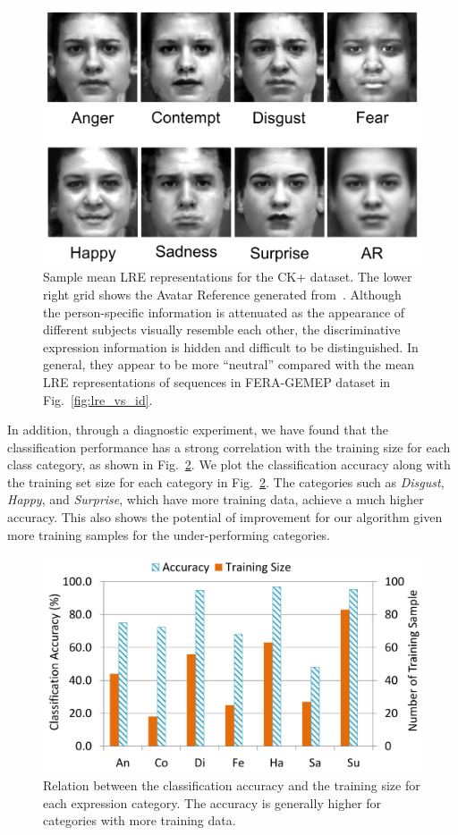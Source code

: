 \documentclass[journal]{IEEEtran}
\begin{document}
\begin{figure}[htbp]
	\centering
		\includegraphics[width=.7\columnwidth]{pics/ck_eai.png}
	\caption{Sample mean LRE representations for the CK+ dataset. The lower right grid shows the Avatar Reference generated from~\cite{Yang_SMCB12}. Although the person-specific information is attenuated as the appearance of different subjects visually resemble each other, the discriminative expression information is hidden and difficult to be distinguished. In general, they appear to be more ``neutral'' compared with the mean LRE representations of sequences in FERA-GEMEP dataset in Fig.~\ref{fig:lre_vs_id}.}
	\label{fig:ck_eai}
\end{figure}


In addition, through a diagnostic experiment, we have found that the classification performance has a strong correlation with the training size for each class category, as shown in Fig.~\ref{fig:fig_ck_size}. We plot the classification accuracy along with the training set size for each category in Fig.~\ref{fig:fig_ck_size}. The categories such as \textit{Disgust}, \textit{Happy}, and \textit{Surprise}, which have more training data, achieve a much higher accuracy. This also shows the potential of improvement for our algorithm given more training samples for the under-performing categories. 


\begin{figure}[htbp]
	\centering
		\includegraphics[width=.8\columnwidth]{pics/fig_ck_size.png}
	\caption{Relation between the classification accuracy and the training size for each expression category. The accuracy is generally higher for categories with more training data.}
	\label{fig:fig_ck_size}
\end{figure}
\end{document}
